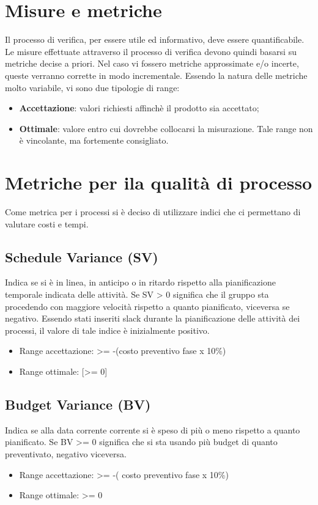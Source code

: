 \section{Misure e metriche}\label{Metriche}
Il processo di verifica, per essere utile ed informativo, deve essere quantificabile. Le misure effettuate attraverso il processo di verifica devono quindi basarsi su metriche decise a priori.
Nel caso vi fossero metriche approssimate e/o incerte, queste verranno corrette in modo incrementale.
Essendo la natura delle metriche molto variabile, vi sono due tipologie di range:
\begin{itemize}
	\item \textbf{Accettazione}: valori richiesti affinchè il prodotto sia accettato;
	\item \textbf{Ottimale}: valore entro cui dovrebbe collocarsi la misurazione. Tale range non è vincolante, ma fortemente consigliato.
\end{itemize}
\section{Metriche per ila qualità di processo}
Come metrica per i processi si è deciso di utilizzare indici che ci permettano di valutare costi e tempi. 
\subsection{Schedule Variance (SV)}
Indica se si è in linea, in anticipo o in ritardo rispetto alla pianificazione temporale indicata delle attività. 
Se SV > 0 significa che il gruppo sta procedendo con maggiore velocità rispetto a quanto pianificato, viceversa se negativo. 
Essendo stati inseriti slack durante la pianificazione delle attività dei processi, il valore di tale indice è inizialmente positivo.
\begin{itemize}
	\item Range accettazione: >= -(costo preventivo fase x 10\%)
	\item Range ottimale: [>= 0] 
\end{itemize}
\subsection{Budget Variance (BV)}
Indica se alla data corrente corrente si è speso di più o meno rispetto a quanto pianificato.
Se BV >= 0 significa che si sta usando più budget di quanto preventivato, negativo viceversa.
\begin{itemize}
	\item  Range accettazione: >= -( costo preventivo fase x 10\%)
	\item Range ottimale: >= 0
\end{itemize}
